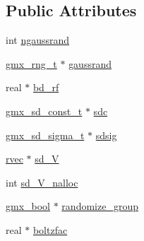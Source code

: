 \subsection*{\-Public \-Attributes}
\begin{DoxyCompactItemize}
\item 
int \hyperlink{structgmx__stochd__t_a255d259c360aa27af1abda178bf3d7ba}{ngaussrand}
\item 
\hyperlink{include_2gmx__random_8h_ab04e36fe2b56587efc5f5738e432ddee}{gmx\-\_\-rng\-\_\-t} $\ast$ \hyperlink{structgmx__stochd__t_aa334878a84598bded6dabda9157ed48e}{gaussrand}
\item 
real $\ast$ \hyperlink{structgmx__stochd__t_a8d3cc09c8bad5553565f25128d79263e}{bd\-\_\-rf}
\item 
\hyperlink{structgmx__sd__const__t}{gmx\-\_\-sd\-\_\-const\-\_\-t} $\ast$ \hyperlink{structgmx__stochd__t_ab99a72bd2459cf085b2221faed78b79c}{sdc}
\item 
\hyperlink{structgmx__sd__sigma__t}{gmx\-\_\-sd\-\_\-sigma\-\_\-t} $\ast$ \hyperlink{structgmx__stochd__t_afc4e2b6aed10e71f0f8ebc2cfd51b79f}{sdsig}
\item 
\hyperlink{share_2template_2gromacs_2types_2simple_8h_aa02a552a4abd2f180c282a083dc3a999}{rvec} $\ast$ \hyperlink{structgmx__stochd__t_ae694235bd35f80edf2cedf127d5af75b}{sd\-\_\-\-V}
\item 
int \hyperlink{structgmx__stochd__t_a2cf951411179d50bf04e7ca4b7202e08}{sd\-\_\-\-V\-\_\-nalloc}
\item 
\hyperlink{include_2types_2simple_8h_a8fddad319f226e856400d190198d5151}{gmx\-\_\-bool} $\ast$ \hyperlink{structgmx__stochd__t_a7faaf05cd4b87f5e08f5bb1932b3c967}{randomize\-\_\-group}
\item 
real $\ast$ \hyperlink{structgmx__stochd__t_ac532bfb5f1f0e4760437ff15c8609fd2}{boltzfac}
\end{DoxyCompactItemize}


